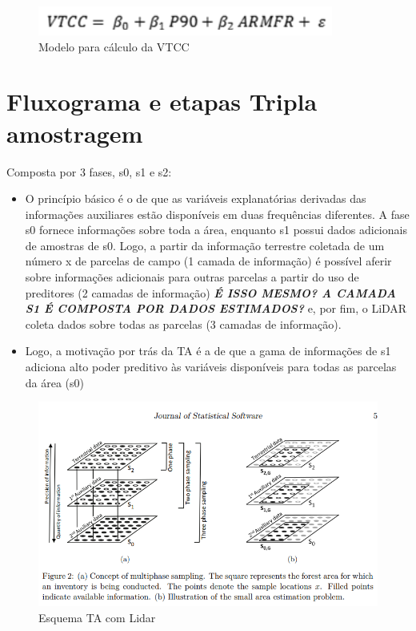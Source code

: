 \documentclass[
]{article}
\begin{document}
\begin{figure}

{\centering \includegraphics[width=0.6\linewidth]{IMAGES/eq-estimador-regressao} 

}

\caption{Modelo para cálculo da VTCC}\label{fig:unnamed-chunk-20}
\end{figure}

\section{Fluxograma e etapas Tripla
amostragem}\label{fluxograma-e-etapas-tripla-amostragem}

Composta por 3 fases, s0, s1 e s2:

\begin{itemize}
\item
  O princípio básico é o de que as variáveis explanatórias derivadas das
  informações auxiliares estão disponíveis em duas frequências
  diferentes. A fase s0 fornece informações sobre toda a área, enquanto
  s1 possui dados adicionais de amostras de s0. Logo, a partir da
  informação terrestre coletada de um número x de parcelas de campo (1
  camada de informação) é possível aferir sobre informações adicionais
  para outras parcelas a partir do uso de preditores (2 camadas de
  informação) \textbf{\emph{É ISSO MESMO? A CAMADA S1 É COMPOSTA POR
  DADOS ESTIMADOS?}} e, por fim, o LiDAR coleta dados sobre todas as
  parcelas (3 camadas de informação).
\item
  Logo, a motivação por trás da TA é a de que a gama de informações de
  s1 adiciona alto poder preditivo às variáveis disponíveis para todas
  as parcelas da área (s0)
\end{itemize}

\begin{figure}

{\centering \includegraphics[width=0.5\linewidth]{IMAGES/esquematizacao-TA} 

}

\caption{Esquema TA com Lidar}\label{fig:unnamed-chunk-21}
\end{figure}
\end{document}
